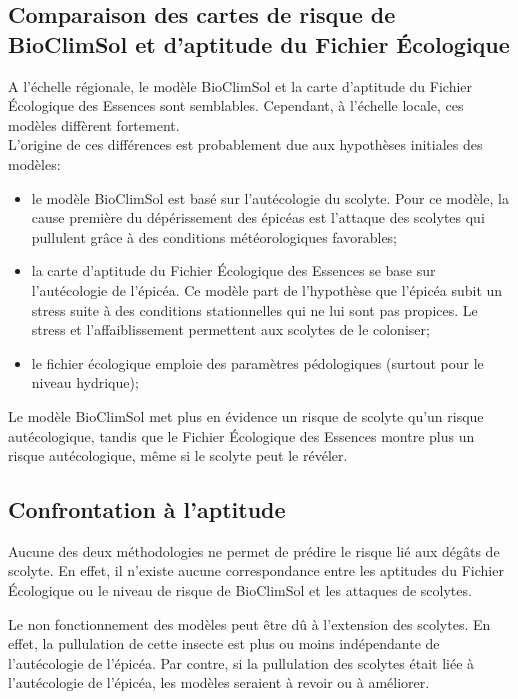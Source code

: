 \subsection{Comparaison des cartes de risque de BioClimSol et d'aptitude du Fichier Écologique}
A l'échelle régionale, le modèle BioClimSol et la carte d'aptitude du Fichier Écologique des Essences sont semblables. Cependant, à l'échelle locale, ces modèles diffèrent fortement.\\

L'origine de ces différences est probablement due aux hypothèses initiales des modèles:

\begin{itemize}
	\item le modèle BioClimSol est basé sur l'autécologie du scolyte. Pour ce modèle, la cause première du dépérissement des épicéas est l'attaque des scolytes qui pullulent grâce à des conditions météorologiques favorables;
	\item la carte d'aptitude du Fichier Écologique des Essences se base sur l'autécologie de l'épicéa. Ce modèle part de l'hypothèse que l'épicéa subit un stress suite à des conditions stationnelles qui ne lui sont pas propices. Le stress et l'affaiblissement permettent aux scolytes de le coloniser;
	\item le fichier écologique emploie des paramètres pédologiques (surtout pour le niveau hydrique);
\end{itemize}

Le modèle BioClimSol met plus en évidence un risque de scolyte qu'un risque autécologique, tandis que le Fichier Écologique des Essences montre plus un risque autécologique, même si le scolyte peut le révéler.






\subsection{Confrontation à l'aptitude}
Aucune des deux méthodologies ne permet de prédire le risque lié aux dégâts de scolyte. En effet, il n'existe aucune correspondance entre les aptitudes du Fichier Écologique ou  le niveau de risque de BioClimSol et les attaques de scolytes.

Le non fonctionnement des modèles peut être dû à l'extension des scolytes. En effet, la pullulation de cette insecte est plus ou moins indépendante de l'autécologie de l'épicéa. 
Par contre, si la pullulation des scolytes était liée à l'autécologie de l'épicéa, les modèles seraient à revoir ou à améliorer.


